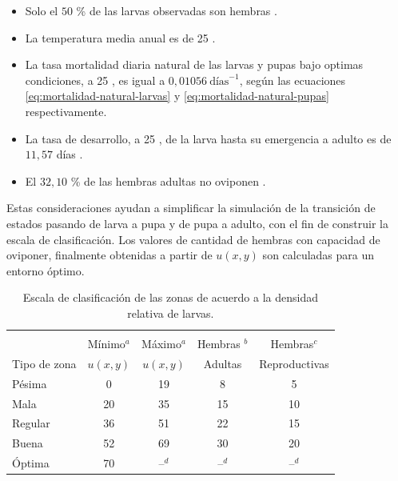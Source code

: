 \begin{itemize}
    \item Solo el $50$ \% de las larvas observadas son hembras \cite{otero2006stochastic, manrique1998desarrollo}.
    \item La temperatura media anual es de 25 \textcelsius \cite{website:mspbsHistoria2014}.
    \item La tasa mortalidad diaria natural de las larvas y pupas bajo optimas condiciones, a 25 \textcelsius, es igual a $0,01056\ \text{días}^{-1}$, según las ecuaciones \eqref{eq:mortalidad-natural-larvas} y \eqref{eq:mortalidad-natural-pupas} respectivamente.
    \item La tasa de desarrollo, a 25 \textcelsius, de la larva hasta su emergencia a adulto es de $11,57$ días \cite{rueda1990temperature}.
    \item El $32,10$ \% de las hembras adultas no oviponen \cite{osoriopontificia}.
\end{itemize}

Estas consideraciones ayudan a simplificar la simulación de la transición de estados pasando de
larva a pupa y de pupa a adulto, con el fin de construir la escala de clasificación. Los valores
de cantidad de hembras con capacidad de oviponer, finalmente obtenidas a partir de $u(x, y)$ son
calculadas para un entorno óptimo.

\begin{table}[!hptb]
    \begin{center}
    \begin{minipage}{\textwidth}
    \begin{center}
        \caption{\label{tab:cap4-puntaje-zona} Escala de clasificación de las zonas de acuerdo a la densidad relativa de larvas.}
        \begin{tabular}{p{3cm} c c c c}
            \hline \\
                         & Mínimo$^a$ & Máximo$^a$ & Hembras $^b$ & Hembras$^c$ \\
            Tipo de zona & $u(x, y)$   & $u(x, y)$   & Adultas & Reproductivas \\
            \hline
            \hline
            Pésima  & 0  & 19 & 8  & 5 \\
            Mala    & 20 & 35 & 15 & 10\\
            Regular & 36 & 51 & 22 & 15\\
            Buena   & 52 & 69 & 30 & 20\\
            Óptima  & 70 & --$^d$ & --$^d$ & --$^d$\\
        \end{tabular}
    \end{center}
    \end{minipage}
    \end{center}
\end{table}

